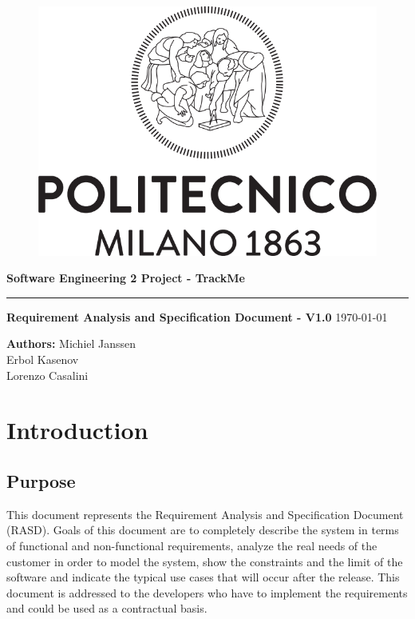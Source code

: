 \documentclass[12pt]{article}
\begin{document}
\begin{titlepage}
    \begin{center}
    \begin{figure}
        \centering
        \includegraphics[scale=0.2]{logoPolimi.png}
        \vspace{1.5cm}
    \end{figure}

    \Huge\textbf{Software Engineering 2 Project - TrackMe}
    \rule{12cm}{0.5pt}
    \Huge\textbf{Requirement Analysis and Specification Document - V1.0}
    \today
    \end{center}
    
    \vspace{3cm}
    
    \begin{flushleft}
        \LARGE\textbf{Authors: }
        \newline\newline
        \Large\texttt{}{Michiel Janssen \\ Erbol Kasenov \\ Lorenzo Casalini}
    \end{flushleft}
\end{titlepage}

\newpage
  \tableofcontents
\newpage

\section{Introduction}
\subsection{Purpose}
This document represents the Requirement Analysis and Specification Document (RASD). Goals of this document are to completely describe the system in terms of functional and non-functional requirements, analyze the real needs of the customer in order to model the system, show the constraints and the limit of the software and indicate the typical use cases that will occur after the release. This document is addressed to the developers who have to implement the requirements and could be used as a contractual basis.
\end{document}
